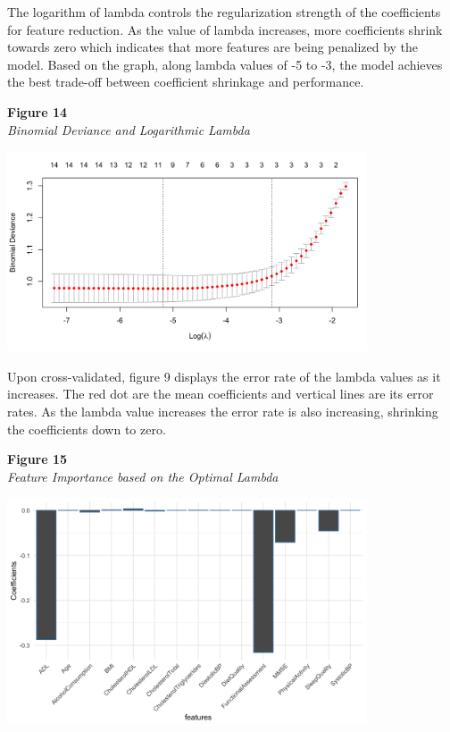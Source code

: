 \documentclass[12pt]{article}
\begin{document}
The logarithm of lambda controls the regularization strength of the coefficients for feature reduction. As the value of lambda increases, more coefficients shrink towards zero which indicates that more features are being penalized by the model. Based on the graph, along lambda values of -5 to -3, the model 
achieves the best trade-off between coefficient shrinkage and performance. 

\noindent
\textbf{Figure 14}\\
\textit{Binomial Deviance and Logarithmic Lambda}
\begin{center}
    \includegraphics[width = 0.8\textwidth]{Binomial Deviance vs Log Lambda.png}
\end{center}

Upon cross-validated, figure 9 displays the error rate of the lambda values as it increases. The red dot are the mean coefficients and vertical lines are its error rates. As the lambda value increases the error rate is also increasing, shrinking the coefficients down to zero. 

\noindent
\textbf{Figure 15}\\
\textit{Feature Importance based on the Optimal Lambda}
\begin{center}
    \includegraphics[width = 0.8\textwidth]{Lasso Feature Selection.png}
\end{center}
\end{document}
